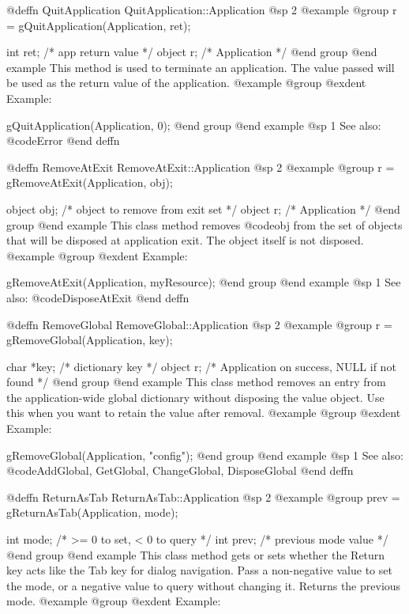 @deffn {QuitApplication} QuitApplication::Application
@sp 2
@example
@group
r = gQuitApplication(Application, ret);

int     ret;    /*  app return value  */
object  r;      /*  Application       */
@end group
@end example
This method is used to terminate an application.  The value passed will
be used as the return value of the application.
@example
@group
@exdent Example:

gQuitApplication(Application, 0);
@end group
@end example
@sp 1
See also:  @code{Error}
@end deffn



@deffn {RemoveAtExit} RemoveAtExit::Application
@sp 2
@example
@group
r = gRemoveAtExit(Application, obj);

object  obj;    /*  object to remove from exit set  */
object  r;      /*  Application                     */
@end group
@end example
This class method removes @code{obj} from the set of objects that
will be disposed at application exit.  The object itself is not
disposed.
@example
@group
@exdent Example:

gRemoveAtExit(Application, myResource);
@end group
@end example
@sp 1
See also:  @code{DisposeAtExit}
@end deffn



@deffn {RemoveGlobal} RemoveGlobal::Application
@sp 2
@example
@group
r = gRemoveGlobal(Application, key);

char    *key;   /*  dictionary key  */
object  r;      /*  Application on success, NULL if not found  */
@end group
@end example
This class method removes an entry from the application-wide global
dictionary without disposing the value object.  Use this when you
want to retain the value after removal.
@example
@group
@exdent Example:

gRemoveGlobal(Application, "config");
@end group
@end example
@sp 1
See also:  @code{AddGlobal, GetGlobal, ChangeGlobal, DisposeGlobal}
@end deffn



@deffn {ReturnAsTab} ReturnAsTab::Application
@sp 2
@example
@group
prev = gReturnAsTab(Application, mode);

int     mode;   /*  >= 0 to set, < 0 to query  */
int     prev;   /*  previous mode value         */
@end group
@end example
This class method gets or sets whether the Return key acts like the
Tab key for dialog navigation.  Pass a non-negative value to set
the mode, or a negative value to query without changing it.  Returns
the previous mode.
@example
@group
@exdent Example:

